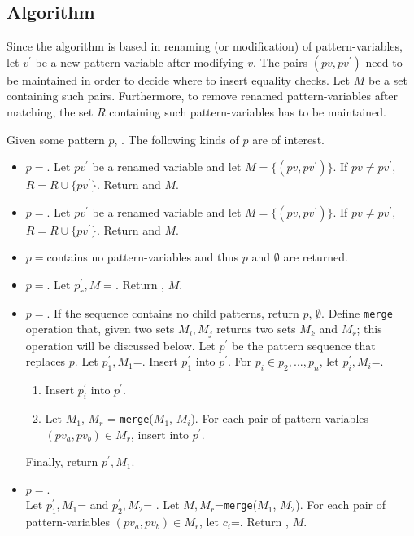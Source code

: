 \subsection{Algorithm}
Since the algorithm is based in renaming (or modification) of pattern-variables, let $v^{\prime}$ be a new pattern-variable after modifying $v$. The pairs $(pv, pv^{\prime})$ need to be maintained in order to decide where to insert equality checks. Let $M$ be a set containing such pairs. Furthermore, to remove renamed pattern-variables after matching, the set $R$ containing such pattern-variables has to be maintained.

Given some pattern $p$, . The following kinds of $p$ are of interest.
\begin{itemize}
\item $p=$\space \BuiltInPattern. Let $pv^{\prime}$ be a renamed variable and let $M=\{(pv, pv^{\prime})\}$. If $pv \neq pv^{\prime}$, $R=R \cup \{pv^{\prime}\}$. Return \BuiltInPattern[$tag$][$pv^{\prime}$][false] and $M$.
\item $p=$\space \NonTerminal. Let $pv^{\prime}$ be a renamed variable and let $M=\{(pv, pv^{\prime})\}$. If $pv \neq pv^{\prime}$, $R=R \cup \{pv^{\prime}\}$. Return \NonTerminal[$nt$][$pv^{\prime}$][false] and $M$.
\item $p=$\space \LiteralPattern \space contains no pattern-variables and thus $p$ and $\emptyset$ are returned.
\item $p=$\space \PatternRepeat. Let $p_r^{\prime}, M=$\space{}. Return \PatternRepeat[$p_r^{\prime}$], $M$.
\item
$p=$\space \PatternSequence. If the sequence contains no child patterns, return $p$, $\emptyset$. Define \texttt{merge} operation that, given two sets $M_i, M_j$ returns two sets $M_k$ and $M_r$; this operation will be discussed below.
Let $p^{\prime}$ be the pattern sequence that replaces $p$.
Let $p_1^{\prime}, M_1$=. Insert $p_1^{\prime}$ into $p^{\prime}$. For $p_i \in p_2, ..., p_n$, let $p_i^{\prime}, M_i$=.
	\begin{enumerate}
	\item
	Insert $p_i^{\prime}$ into $p^{\prime}$.
	\item
	Let $M_1$, $M_r$ = \texttt{merge}($M_1$, $M_i$). For each pair of pattern-variables $(pv_a, pv_b) \in M_r$, insert \PatternCheckConstraint[$pv_a$][$pv_b$][false] into $p^{\prime}$.
	\end{enumerate}
Finally, return $p^{\prime}, M_1$.

\item
$p=$\space \PatternInHole.\\ Let $p_1^{\prime}, M_1$=  and $p_2^{\prime}, M_2$= . Let $M, M_r$=\texttt{merge}($M_1$, $M_2$). For each pair of pattern-variables $(pv_a, pv_b) \in M_r$, let $c_i$=\PatternCheckConstraint[$pv_a$][$pv_b$][false]. Return \PatternInHole[$p_1^{\prime}$][$p_2^{\prime}$][$c_1$][$c_n$][false], $M$.
\end{itemize}

